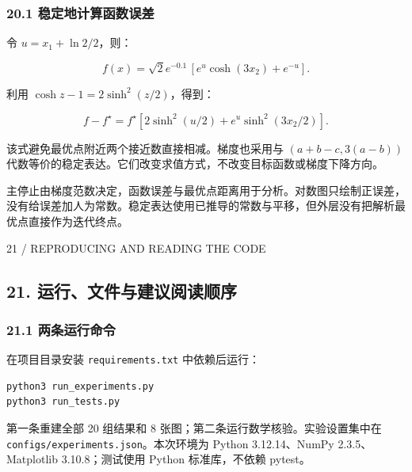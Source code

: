 \documentclass[10pt,a4paper]{article}
\newcommand{\eyebrow}[1]{{\sffamily\fontsize{8.3}{12}\selectfont\color{navy}#1}\par\vspace{4pt}{\color{navy}\hrule height 1pt}\vspace{12pt}}
\begin{document}
\subsubsection{20.1
稳定地计算函数误差}\label{ux7a33ux5b9aux5730ux8ba1ux7b97ux51fdux6570ux8befux5dee}

令 \(u=x_1+\ln2/2\)，则：

\[f(x)=\sqrt2e^{-0.1}\,[e^u\cosh(3x_2)+e^{-u}].\]

利用 \(\cosh z-1=2\sinh^2(z/2)\)，得到：

\[\boxed{f-f^\star=f^\star\left[2\sinh^2(u/2)+e^u\sinh^2(3x_2/2)\right].}\]

该式避免最优点附近两个接近数直接相减。梯度也采用与 \((a+b-c,3(a-b))\)
代数等价的稳定表达。它们改变求值方式，不改变目标函数或梯度下降方向。

主停止由梯度范数决定，函数误差与最优点距离用于分析。对数图只绘制正误差，没有给误差加人为常数。稳定表达使用已推导的常数与平移，但外层没有把解析最优点直接作为迭代终点。

\clearpage

\eyebrow{21 / REPRODUCING AND READING THE CODE}

\subsection{21.
运行、文件与建议阅读顺序}\label{ux8fd0ux884cux6587ux4ef6ux4e0eux5efaux8baeux9605ux8bfbux987aux5e8f}

\subsubsection{21.1
两条运行命令}\label{ux4e24ux6761ux8fd0ux884cux547dux4ee4}

在项目目录安装 \texttt{requirements.txt} 中依赖后运行：

\begin{verbatim}
python3 run_experiments.py
python3 run_tests.py
\end{verbatim}

第一条重建全部 20 组结果和 8 张图；第二条运行数学核验。实验设置集中在
\texttt{configs/experiments.json}。本次环境为 Python 3.12.14、NumPy
2.3.5、Matplotlib 3.10.8；测试使用 Python 标准库，不依赖 pytest。
\end{document}
